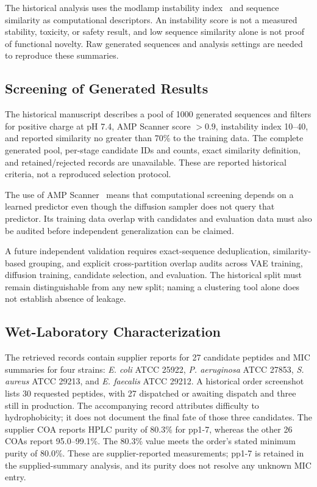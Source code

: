 \documentclass[journal]{IEEEtran}
\begin{document}
The historical analysis uses the modlamp instability index~\cite{muller2018modlamp} and sequence similarity as computational descriptors. An instability score is not a measured stability, toxicity, or safety result, and low sequence similarity alone is not proof of functional novelty. Raw generated sequences and analysis settings are needed to reproduce these summaries.

\subsection{Screening of Generated Results}

The historical manuscript describes a pool of 1000 generated sequences and filters for positive charge at pH 7.4, AMP Scanner score $>0.9$, instability index 10--40, and reported similarity no greater than 70\% to the training data. The complete generated pool, per-stage candidate IDs and counts, exact similarity definition, and retained/rejected records are unavailable. These are reported historical criteria, not a reproduced selection protocol.

The use of AMP Scanner~\cite{veltri2018ampscannerv2} means that computational screening depends on a learned predictor even though the diffusion sampler does not query that predictor. Its training data overlap with candidates and evaluation data must also be audited before independent generalization can be claimed.

A future independent validation requires exact-sequence deduplication, similarity-based grouping, and explicit cross-partition overlap audits across VAE training, diffusion training, candidate selection, and evaluation. The historical split must remain distinguishable from any new split; naming a clustering tool alone does not establish absence of leakage.

\subsection{Wet-Laboratory Characterization}

The retrieved records contain supplier reports for 27 candidate peptides and MIC summaries for four strains: \textit{E. coli} ATCC 25922, \textit{P. aeruginosa} ATCC 27853, \textit{S. aureus} ATCC 29213, and \textit{E. faecalis} ATCC 29212. A historical order screenshot lists 30 requested peptides, with 27 dispatched or awaiting dispatch and three still in production. The accompanying record attributes difficulty to hydrophobicity; it does not document the final fate of those three candidates. The supplier COA reports HPLC purity of 80.3\% for pp1-7, whereas the other 26 COAs report 95.0--99.1\%. The 80.3\% value meets the order's stated minimum purity of 80.0\%. These are supplier-reported measurements; pp1-7 is retained in the supplied-summary analysis, and its purity does not resolve any unknown MIC entry.
\end{document}
